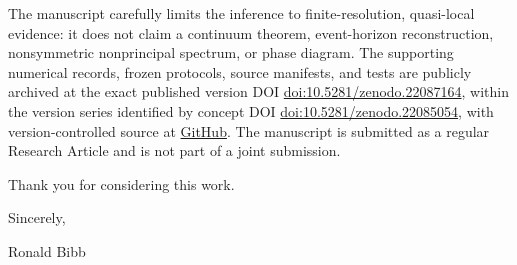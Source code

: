 \documentclass[11pt]{article}
\begin{document}
The manuscript carefully limits the inference to finite-resolution,
quasi-local evidence: it does not claim a continuum theorem, event-horizon
reconstruction, nonsymmetric nonprincipal spectrum, or phase diagram.  The
supporting numerical records, frozen protocols, source manifests, and tests
are publicly archived at the exact published version DOI
\href{https://doi.org/10.5281/zenodo.22087164}{doi:10.5281/zenodo.22087164},
within the version series identified by concept DOI
\href{https://doi.org/10.5281/zenodo.22085054}{doi:10.5281/zenodo.22085054},
with version-controlled source at
\href{https://github.com/RonBibb/free-boundary-mots-saddle-node}{GitHub}.
The manuscript is submitted as a regular Research Article and is not part of
a joint submission.

Thank you for considering this work.

Sincerely,

Ronald Bibb
\end{document}
